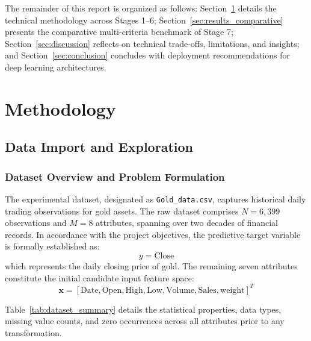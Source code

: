 \documentclass[conference]{IEEEtran}
\begin{document}
The remainder of this report is organized as follows: Section~\ref{sec:methodology} details the technical methodology across Stages 1--6; Section~\ref{sec:results_comparative} presents the comparative multi-criteria benchmark of Stage 7; Section~\ref{sec:discussion} reflects on technical trade-offs, limitations, and insights; and Section~\ref{sec:conclusion} concludes with deployment recommendations for deep learning architectures.

\section{Methodology}
\label{sec:methodology}

\subsection{Data Import and Exploration}
\label{sec:data_import_exploration}

\subsubsection{Dataset Overview and Problem Formulation}
The experimental dataset, designated as \texttt{Gold\_data.csv}, captures historical daily trading observations for gold assets. The raw dataset comprises $N = 6{,}399$ observations and $M = 8$ attributes, spanning over two decades of financial records. In accordance with the project objectives, the predictive target variable is formally established as:
\begin{equation}
    y = \text{Close}
\end{equation}
which represents the daily closing price of gold. The remaining seven attributes constitute the initial candidate input feature space:
\begin{equation}
    \mathbf{x} = \left[ \text{Date}, \text{Open}, \text{High}, \text{Low}, \text{Volume}, \text{Sales}, \text{weight} \right]^T
\end{equation}

Table~\ref{tab:dataset_summary} details the statistical properties, data types, missing value counts, and zero occurrences across all attributes prior to any transformation.
\end{document}
